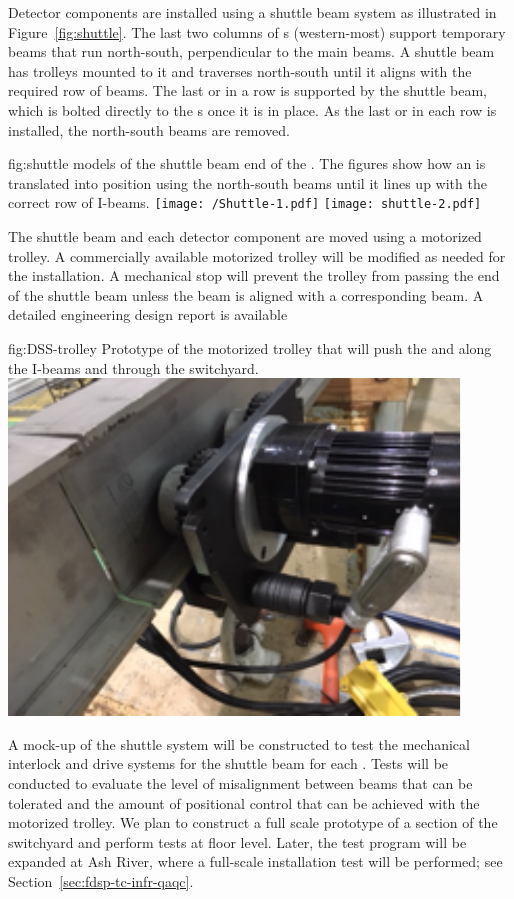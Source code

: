 Detector components are installed using a shuttle beam system as
illustrated in Figure~\ref{fig:shuttle}.  
The last two columns of \fdth{}s (western-most) support temporary beams that run
north-south, perpendicular to the main  beams.  
A shuttle beam has trolleys mounted to it and traverses 
north-south until it aligns with the required row of  beams.  
The last  or  in a row is supported by the shuttle beam, which is bolted directly to the \fdth{}s once it is in place.  
As the last  or  in each row is installed, the north-south beams are removed.

\begin{dunefigure}{fig:shuttle}
  {\threed models of the shuttle beam end of the . The figures show how an 
is translated into position using the north-south beams until it lines up with the correct
row of I-beams.}
\texttt{[image: /Shuttle-1.pdf]}
 \texttt{[image: shuttle-2.pdf]}
\end{dunefigure}

The shuttle beam and each detector component are moved using a motorized trolley.  A commercially available motorized trolley will be modified as needed for the installation. A mechanical stop will prevent the trolley from passing the end of the shuttle beam unless the beam is aligned with a corresponding  beam. A detailed engineering design report is available \cite{bib:docdb6260}

\begin{dunefigure}{fig:DSS-trolley}
  {Prototype of the motorized  trolley that will push the  and  along the I-beams and through the switchyard.}
\includegraphics[width=.49\textwidth]{graphics/DSS-trolley.pdf}
\end{dunefigure}



A mock-up of the shuttle system will be constructed to test the mechanical interlock and drive systems for the shuttle beam for each .  
Tests will be conducted to evaluate the level of misalignment between beams that can be tolerated and the amount of positional control that can be achieved with the motorized trolley. 
We plan to construct a full scale prototype of a section of the  switchyard and perform tests at floor level. 
Later, the test program will be expanded at Ash River, where a full-scale installation test will be performed; see Section~\ref{sec:fdsp-tc-infr-qaqc}.
